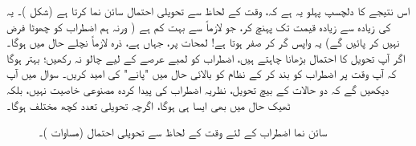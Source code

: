 اس نتیجے کا دلچسپ پہلو یہ ہے کہ،   وقت کے لحاظ سے  تحویلی  احتمال سائن نما   کرتا ہے (شکل )۔
 یہ  کی زیادہ سے زیادہ قیمت تک پہنچ کر،  جو لازماً   سے بہت کم ہے ( ورنہ ہم  اضطراب کو چھوٹا فرض نہیں کر پائیں گے)  یہ واپس  گر کر صفر ہوتا ہے!  لمحات  پر،  جہاں  ہے،  ذرہ لازماً نچلے حال میں ہوگا۔  اگر آپ تحویل  کا احتمال بڑھانا چاہتے ہیں،  اضطراب کو لمبے عرصے  کے لیے چالو نہ رکھیں؛  بہتر ہوگا کہ آپ وقت  پر اضطراب کو بند  کر کے  نظام کو بالائی حال میں "پانے"  کی امید کریں۔ سوال   میں آپ دیکھیں گے کہ دو حالات کے بیچ  تحویل،  نظریہ اضطراب کی پیدا کردہ  مصنوعی خاصیت  نہیں،  بلکہ  ٹھیک حال میں بھی ایسا ہی  ہوگا،  اگرچہ  تحویلی  تعدد کچھ مختلف ہوگا۔

\begin{figure}
\centering
{}
\caption{سائن نما اضطراب کے لئے وقت کے لحاظ سے تحویلی احتمال (مساوات )۔}
\label{شکل_تابع_وقت_احتمال_سائن_نما_احتمال}
\end{figure}


